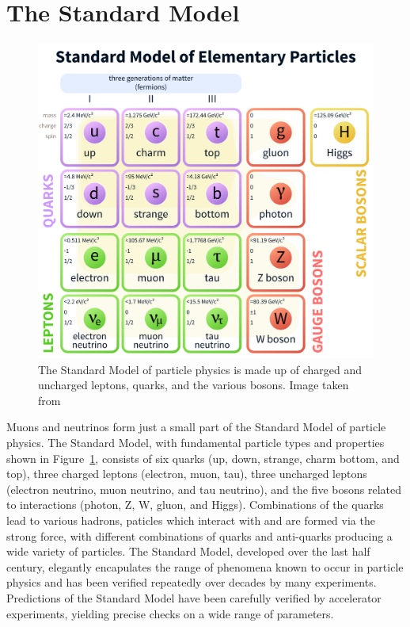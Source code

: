 \label{sec:standard_model}
\section{The Standard Model}

\begin{figure}
\centering
\includegraphics[width=0.7\linewidth]{Standard_Model_of_Elementary_Particles.png}
\caption{The Standard Model of particle physics is made up of charged and uncharged leptons, quarks, and the various bosons. Image taken from \cite{StandardModel-Image}}
\label{fig:standard_model}
\end{figure}

Muons and neutrinos form just a small part of the Standard Model of particle physics.
The Standard Model, with fundamental particle types and properties shown in Figure~\ref{fig:standard_model}, consists of six quarks (up, down, strange, charm bottom, and top), three charged leptons (electron, muon, tau), three uncharged leptons (electron neutrino, muon neutrino, and tau neutrino), and the five bosons related to interactions (photon, Z, W, gluon, and Higgs).
Combinations of the quarks lead to various hadrons, paticles which interact with and are formed via the strong force, with different combinations of quarks and anti-quarks producing a wide variety of particles.
The Standard Model, developed over the last half century, elegantly encapulates the range of phenomena known to occur in particle physics and has been verified repeatedly over decades by many experiments.
Predictions of the Standard Model have been carefully verified by accelerator experiments, yielding precise checks on a wide range of parameters.

